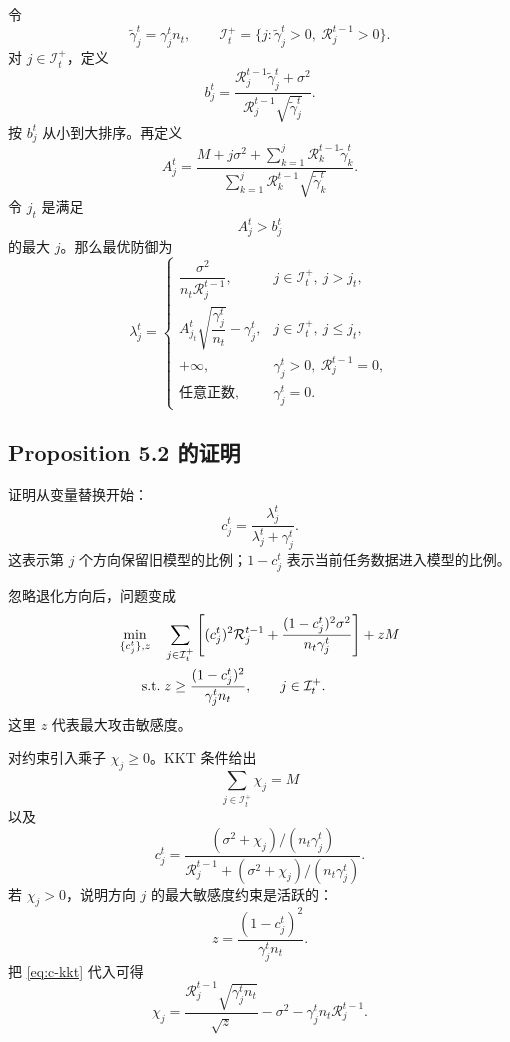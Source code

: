 \documentclass[UTF8,fontset=none,11pt]{ctexart}
\theoremstyle{cnstyle}
\newcommand{\calR}{\mathcal{R}}
\newcommand{\calI}{\mathcal{I}}
\newcommand{\st}{\;\mathrm{s.t.}\;}
\begin{document}
令
\[
  \tilde\gamma_j^t=\gamma_j^tn_t,\qquad
  \calI_t^+=\{j:\tilde\gamma_j^t>0,\ \calR_j^{t-1}>0\}.
\]
对 \(j\in\calI_t^+\)，定义
\[
  b_j^t=
  \frac{\calR_j^{t-1}\tilde\gamma_j^t+\sigma^2}
  {\calR_j^{t-1}\sqrt{\tilde\gamma_j^t}} .
\]
按 \(b_j^t\) 从小到大排序。再定义
\[
  A_j^t=
  \frac{
  M+j\sigma^2+\sum_{k=1}^j\calR_k^{t-1}\tilde\gamma_k^t
  }{
  \sum_{k=1}^j\calR_k^{t-1}\sqrt{\tilde\gamma_k^t}
  } .
\]
令 \(j_t\) 是满足
\[
  A_j^t>b_j^t
\]
的最大 \(j\)。那么最优防御为
\begin{equation}
  \lambda_j^t=
  \begin{cases}
  \dfrac{\sigma^2}{n_t\calR_j^{t-1}},
  & j\in\calI_t^+,\ j>j_t,\\[0.9em]
  A_{j_t}^t\sqrt{\dfrac{\gamma_j^t}{n_t}}-\gamma_j^t,
  & j\in\calI_t^+,\ j\le j_t,\\[0.9em]
  +\infty,
  & \gamma_j^t>0,\ \calR_j^{t-1}=0,\\[0.4em]
  \text{任意正数},
  & \gamma_j^t=0 .
  \end{cases}
  \label{eq:rfd-lambda}
\end{equation}

\subsection{Proposition 5.2 的证明}

证明从变量替换开始：
\[
  c_j^t=\frac{\lambda_j^t}{\lambda_j^t+\gamma_j^t}.
\]
这表示第 \(j\) 个方向保留旧模型的比例；\(1-c_j^t\) 表示当前任务数据进入模型的比例。

忽略退化方向后，问题变成
\begin{align}
  \min_{\{c_j^t\},z}\quad
  &
  \sum_{j\in\calI_t^+}
  \left[
  (c_j^t)^2\calR_j^{t-1}
  +
  \frac{(1-c_j^t)^2\sigma^2}{n_t\gamma_j^t}
  \right]
  +zM
  \notag\\
  \st&
  z\ge
  \frac{(1-c_j^t)^2}{\gamma_j^tn_t},
  \qquad j\in\calI_t^+ .
  \label{eq:kkt-problem}
\end{align}
这里 \(z\) 代表最大攻击敏感度。

对约束引入乘子 \(\chi_j\ge0\)。KKT 条件给出
\[
  \sum_{j\in\calI_t^+}\chi_j=M
\]
以及
\begin{equation}
  c_j^t=
  \frac{(\sigma^2+\chi_j)/(n_t\gamma_j^t)}
  {\calR_j^{t-1}+(\sigma^2+\chi_j)/(n_t\gamma_j^t)} .
  \label{eq:c-kkt}
\end{equation}
若 \(\chi_j>0\)，说明方向 \(j\) 的最大敏感度约束是活跃的：
\[
  z=\frac{(1-c_j^t)^2}{\gamma_j^tn_t}.
\]
把 \eqref{eq:c-kkt} 代入可得
\begin{equation}
  \chi_j
  =
  \frac{\calR_j^{t-1}\sqrt{\gamma_j^tn_t}}{\sqrt z}
  -\sigma^2
  -\gamma_j^tn_t\calR_j^{t-1}.
  \label{eq:chi}
\end{equation}
\end{document}
